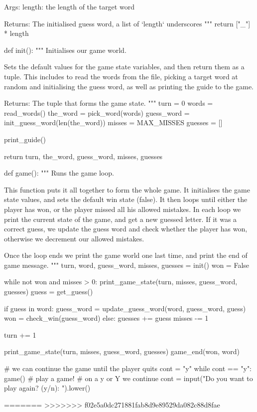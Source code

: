 {\begin{python}
    Args:
        length: the length of the target word
    
    Returns:
        The initialised guess word, a list of `length` underscores
    """
    return ["_"] * length


def init():
    """
    Initialises our game world.

    Sets the default values for the game state variables, and then return
    them as a tuple. This includes to read the words from the file, picking
    a target word at random and initialising the guess word, as well as
    printing the guide to the game.

    Returns:
        The tuple that forms the game state.
    """
    turn = 0
    words = read_words()
    the_word = pick_word(words)
    guess_word = init_guess_word(len(the_word))
    misses = MAX_MISSES
    guesses = []

    print_guide()

    return turn, the_word, guess_word, misses, guesses


def game():
    """
    Runs the game loop.

    This function puts it all together to form the whole game. It initialises
    the game state values, and sets the default win state (false).
    It then loops until either the player has won, or the player missed all
    his allowed mistakes.
    In each loop we print the current state of the game, and get a new guessed
    letter. If it was a correct guess, we update the guess word and check
    whether the player has won, otherwise we decrement our allowed mistakes.

    Once the loop ends we print the game world one last time, and print
    the end of game message.
    """
    turn, word, guess_word, misses, guesses = init()
    won = False

    while not won and misses > 0:
        print_game_state(turn, misses, guess_word, guesses)
        guess = get_guess()

        if guess in word:
            guess_word = update_guess_word(word, guess_word, guess)
            won = check_win(guess_word)
        else:
            guesses += guess
            misses -= 1
        
        turn += 1

    print_game_state(turn, misses, guess_word, guesses)
    game_end(won, word)


# we can continue the game until the player quits
cont = "y"
while cont == "y":
    game() # play a game!
    # on a y or Y we continue
    cont = input("Do you want to play again? (y/n): ").lower()
\end{python}
=======
>>>>>>> f02e5a0dc271881fab8d9e89529da082c88d8fae
}



